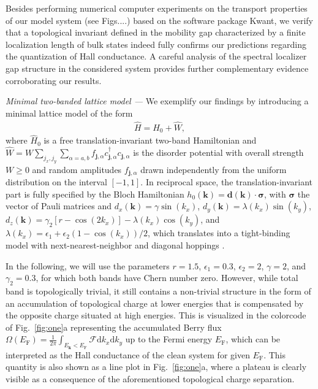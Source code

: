 \documentclass[aps,prl,amsmath,amssymb,twocolumn]{revtex4-2}
\begin{document}
Besides performing numerical computer experiments on the transport properties of our model system (see Figs....) based on the software package Kwant, we verify that a topological invariant defined in the mobility gap characterized by a finite localization length of bulk states indeed fully confirms our predictions regarding the quantization of Hall conductance. A careful analysis of the spectral localizer gap structure in the considered system provides further complementary evidence corroborating our results.  







{\it Minimal two-banded lattice model ---}
We exemplify our findings by introducing a minimal lattice model of the form 
\begin{align}
\hat H = \hat H_0 + \hat W,
\end{align}
where $\hat H_0$ is a free translation-invariant two-band Hamiltonian and $\hat W = W\sum_{j_x, j_y} \sum_{\alpha = a,b} f_{\bm j, \alpha} c_{\bm j, \alpha}^\dagger c_{\bm j, \alpha}$ is the disorder potential with overall strength $W \ge 0$ and random amplitudes $f_{\bm j, \alpha}$ drawn independently from the uniform distribution on the interval $[-1,1]$. In reciprocal space, the translation-invariant part is fully specified by the Bloch Hamiltonian $h_0(\bm k ) = \bm d(\bm k) \cdot \bm \sigma$, with $\bm \sigma$ the vector of Pauli matrices and $d_x(\bm k) = \gamma \sin(k_x)$, $d_y(\bm k) = \lambda(k_x) \sin(k_y)$, $d_z(\bm k) = \gamma_2[r - \cos(2 k_x)] - \lambda(k_x) \cos(k_y)$, and $\lambda(k_x) =  \epsilon_1 + \epsilon_2 (1 - \cos(k_x))/2 $, which translates into a tight-binding model with next-nearest-neighbor and diagonal hoppings \cite{Supplemental}. 

In the following, we will use the parameters $r = 1.5$, $\epsilon_1 = 0.3$, $\epsilon_2 = 2$, $\gamma  =2$, and $\gamma_2 = 0.3$, for which both bands have Chern number zero. However, while total band is topologically trivial, it still contains a non-trivial structure in the form of an accumulation of topological charge at lower energies that is compensated by the opposite charge situated at high energies. This is visualized in the colorcode of Fig.~\ref{fig:one}a representing the accumulated Berry flux $\Omega(E_\mathrm{F}) = \frac{1}{2 \pi} \int_{E_{\bm k} < E_\mathrm{F}} \mathcal F \mathrm{d} k_x \mathrm{d} k_y$ up to the Fermi energy $E_\mathrm{F}$, which can be interpreted as the Hall conductance of the clean system for given $E_\mathrm{F}$. This quantity is also shown as a line plot in Fig.~\ref{fig:one}a, where a plateau is clearly visible as a consequence of the aforementioned topological charge separation. 
\end{document}
